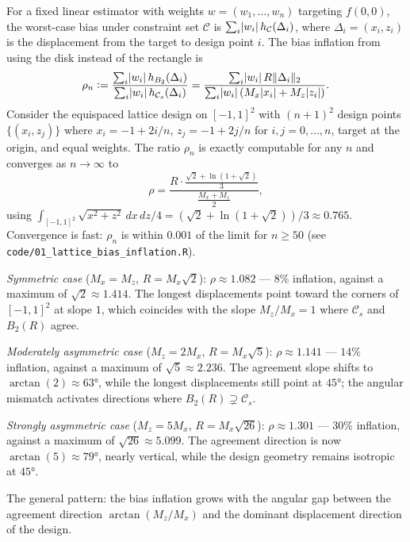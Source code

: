 \begin{remark}\label{rem:lattice_inflation}
	For a fixed linear estimator with weights $w = (w_1, \ldots, w_n)$ targeting $f(0,0)$, the worst-case bias under constraint set $\mathcal{C}$ is $\sum_i \lvert w_i\rvert\, h_{\mathcal{C}}(\Delta_i)$, where $\Delta_i = (x_i, z_i)$ is the displacement from the target to design point $i$.
	The bias inflation from using the disk instead of the rectangle is
	\begin{equation*}
		\rho_n \vcentcolon= \frac{\sum_i \lvert w_i\rvert\, h_{B_2}(\Delta_i)}{\sum_i \lvert w_i\rvert\, h_{\mathcal{C}_s}(\Delta_i)} = \frac{\sum_i \lvert w_i\rvert\, R \lVert\Delta_i\rVert_2}{\sum_i \lvert w_i\rvert\, (M_x\lvert x_i\rvert + M_z\lvert z_i\rvert)}.
	\end{equation*}
	Consider the equispaced lattice design on $[-1,1]^2$ with $(n+1)^2$ design points $\{(x_i, z_j)\}$ where $x_i = -1 + 2i/n$, $z_j = -1 + 2j/n$ for $i, j = 0, \ldots, n$, target at the origin, and equal weights.
	The ratio $\rho_n$ is exactly computable for any $n$ and converges as $n \to \infty$ to
	\begin{equation*}
		\rho = \frac{R \cdot \tfrac{\sqrt{2} + \ln(1 + \sqrt{2})}{3}}{\tfrac{M_x + M_z}{2}},
	\end{equation*}
	using $\int_{[-1,1]^2} \sqrt{x^2 + z^2}\, dx\, dz / 4 = (\sqrt{2} + \ln(1+\sqrt{2}))/3 \approx 0.765$.
	Convergence is fast: $\rho_n$ is within $0.001$ of the limit for $n \geq 50$ (see \texttt{code/01\_lattice\_bias\_inflation.R}).

	\emph{Symmetric case} ($M_x = M_z$, $R = M_x\sqrt{2}$): $\rho \approx 1.082$ --- $8\%$ inflation, against a maximum of $\sqrt{2} \approx 1.414$.
	The longest displacements point toward the corners of $[-1,1]^2$ at slope $1$, which coincides with the slope $M_z / M_x = 1$ where $\mathcal{C}_s$ and $B_2(R)$ agree.

	\emph{Moderately asymmetric case} ($M_z = 2 M_x$, $R = M_x\sqrt{5}$): $\rho \approx 1.141$ --- $14\%$ inflation, against a maximum of $\sqrt{5} \approx 2.236$.
	The agreement slope shifts to $\arctan(2) \approx 63°$, while the longest displacements still point at $45°$; the angular mismatch activates directions where $B_2(R) \supsetneq \mathcal{C}_s$.

	\emph{Strongly asymmetric case} ($M_z = 5 M_x$, $R = M_x\sqrt{26}$): $\rho \approx 1.301$ --- $30\%$ inflation, against a maximum of $\sqrt{26} \approx 5.099$.
	The agreement direction is now $\arctan(5) \approx 79°$, nearly vertical, while the design geometry remains isotropic at $45°$.

	The general pattern: the bias inflation grows with the angular gap between the agreement direction $\arctan(M_z / M_x)$ and the dominant displacement direction of the design.
\end{remark}

